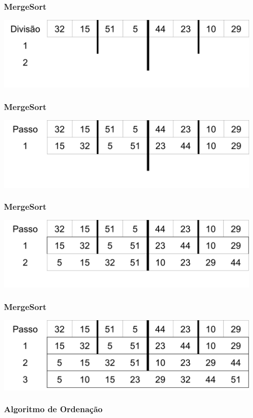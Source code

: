 \documentclass{beamer}
\begin{document}
\begin{frame}
    \frametitle{MergeSort}
    \centering
    \includegraphics[scale=0.5]{images/2.png}
\end{frame}

\begin{frame}
    \frametitle{MergeSort}
    \centering
    \includegraphics[scale=0.5]{images/3.png}
\end{frame}

\begin{frame}
    \frametitle{MergeSort}
    \centering
    \includegraphics[scale=0.5]{images/4.png}
\end{frame}

\begin{frame}
    \frametitle{MergeSort}
    \centering
    \includegraphics[scale=0.5]{images/5.png}
\end{frame}

\begin{frame}
	\frametitle{Algoritmo de Ordenação}
    \centering
    
\end{frame}
\end{document}
